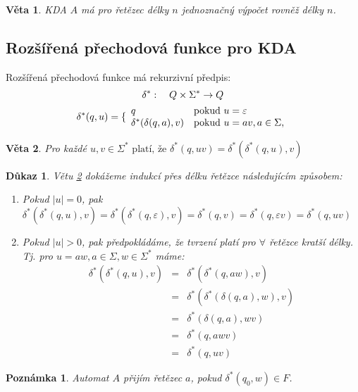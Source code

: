 \documentclass[10pt, a4paper, titlepage]{article}
\theoremstyle{note}
\newtheorem{veta}{Věta}
\newtheorem{dukaz}{Důkaz}
\newtheorem{poznamka}{Poznámka}
\begin{document}
\begin{veta}
KDA $A$ má pro řetězec délky $n$ jednoznačný výpočet rovněž délky $n$.
\end{veta}

\subsection{Rozšířená přechodová funkce pro KDA}

Rozšířená přechodová funkce má rekurzivní předpis:
\begin{gather*}
\delta^*:\quad Q \times \Sigma^* \rightarrow Q \\
\delta^*(q, u) = \lbrace
\begin{array}{l l}
q & \text{pokud } u = \varepsilon \\
\delta^*(\delta(q, a), v) & \text{pokud } u = av, a \in \Sigma, 
\end{array}
\end{gather*}

\begin{veta}\label{veta-kdaaa}
Pro každé $u,v \in \Sigma^* \text{ platí, že } \delta^*(q, uv) = \delta^*(\delta^*(q, u), v)$
\end{veta}

\begin{dukaz}
Větu \ref{veta-kdaaa} dokážeme indukcí přes délku řetězce následujícím způsobem:
\begin{enumerate}
\item
Pokud $|u| = 0$, pak $\delta^*(\delta^*(q,u),v) = \delta^*(\delta^*(q, \varepsilon),v) = \delta^*(q,v) = \delta^*(q, \varepsilon v)
= \delta^*(q,uv)$

\item
Pokud $|u| > 0$, pak předpokládáme, že tvrzení platí pro $\forall$ řetězce kratší délky. Tj. pro $u = aw, a \in \Sigma, w \in \Sigma^*$ máme:
\begin{eqnarray*}
\delta^*(\delta^*(q,u),v) &=& \delta^*(\delta^*(q, aw),v) \\
&=& \delta^*(\delta^*(\delta(q,a),w),v) \\
&=& \delta^*(\delta(q,a),wv) \\
&=& \delta^*(q,awv) \\
&=& \delta^*(q,uv)
\end{eqnarray*}
\end{enumerate}
\end{dukaz}

\begin{poznamka}
Automat $A$ přijím řetězec $a$, pokud $\delta^*(q_0,w) \in F$.
\end{poznamka}
\end{document}
